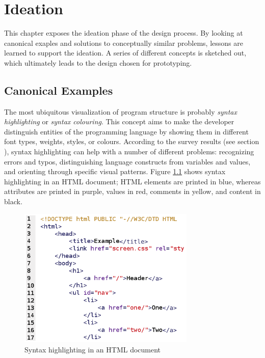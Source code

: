 \chapter{Ideation}\label{ideation}

This chapter exposes the ideation phase of the design process. By
looking at canonical exaples and solutions to conceptually similar
problems, lessons are learned to support the ideation. A series of
different concepts is sketched out, which ultimately leads to the design
chosen for prototyping.

\section{Canonical Examples}\label{similar}

The most ubiquitous visualization of program structure is probably
\emph{syntax highlighting} or \emph{syntax colouring}. This concept aims
to make the developer distinguish entities of the programming language
by showing them in different font types, weights, styles, or colours.
According to the survey results (see section
), syntax highlighting can help with a number
of different problems: recognizing errors and typos, distinguishing
language constructs from variables and values, and orienting through
specific visual patterns. Figure \ref{fig:syntaxhighlighting} shows
syntax highlighting in an HTML document; HTML elements are printed in
blue, whereas attributes are printed in purple, values in red, comments
in yellow, and content in black.

\begin{figure}[htbp]
\centering
\includegraphics[keepaspectratio,width=0.75\textwidth]{img/syntax_highlighting.png}
\caption{Syntax highlighting in an HTML document}
\label{fig:syntaxhighlighting}
\end{figure}

